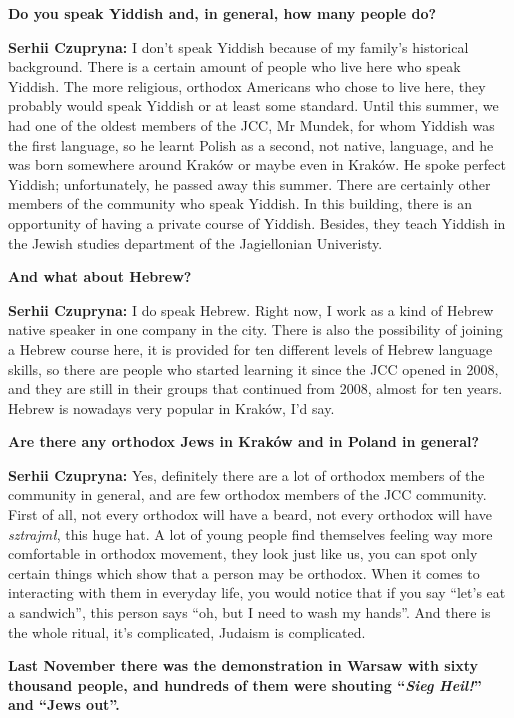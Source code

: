 \textbf{Do you speak Yiddish and, in general, how many people do?} \par
\textbf{Serhii Czupryna:} I don’t speak Yiddish because of my family’s historical background. There is a certain amount of people who live here who speak Yiddish. The more religious, orthodox Americans who chose to live here, they probably would speak Yiddish or at least some standard. Until this summer, we had one of the oldest members of the JCC, Mr Mundek, for whom Yiddish was the first language, so he learnt Polish as a second, not native, language, and he was born somewhere around Kraków or maybe even in Kraków. He spoke perfect Yiddish; unfortunately, he passed away this summer. There are certainly other members of the community who speak Yiddish. In this building, there is an opportunity of having a private course of Yiddish. Besides, they teach Yiddish in the Jewish studies department of the Jagiellonian Univeristy.\par
\textbf{And what about Hebrew?} \par
\textbf{Serhii Czupryna:} I do speak Hebrew. Right now, I work as a kind of Hebrew native speaker in one company in the city. There is also the possibility of joining a Hebrew course here, it is provided for ten different levels of Hebrew language skills, so there are people who started learning it since the JCC opened in 2008, and they are still in their groups that continued from 2008, almost for ten years. Hebrew is nowadays very popular in Kraków, I’d say.  \par 
\textbf{Are there any orthodox Jews in Kraków and in Poland in general?} \par 
\textbf{Serhii Czupryna:} Yes, definitely there are a lot of orthodox members of the community in general, and are few orthodox members of the JCC community. First of all, not every orthodox will have a beard, not every orthodox will have \textit{sztrajmł}, this huge hat. A lot of young people find themselves feeling way more comfortable in orthodox movement, they look just like us, you can spot only certain things which show that a person may be orthodox. When it comes to interacting with them in everyday life, you would notice that if you say ``let’s eat a sandwich'', this person says ``oh, but I need to wash my hands''. And there is the whole ritual, it’s complicated, Judaism is complicated. \par
\textbf{Last November there was the demonstration in Warsaw with sixty thousand people, and hundreds of them were shouting ``\textit{Sieg Heil!}'' and ``Jews out''.}\par 
